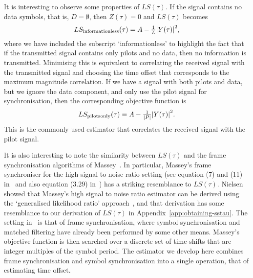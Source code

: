 \documentclass[journal]{IEEEtranTCOM}
\begin{document}
It is interesting to observe some properties of $LS(\tau)$.  If the signal contains no data symbols, that is, $D = \emptyset$, then $Z(\tau) = 0$ and $LS(\tau)$ becomes
\[
LS_{\text{informationless}}(\tau)  = A - \tfrac{1}{L} {\left\vert Y(\tau) \right\vert}^2,
\]
where we have included the subscript `informationless' to highlight the fact that if the transmitted signal contains only pilots and no data, then no information is transmitted.  Minimising this is equivalent to correlating the received signal with the transmitted signal and choosing the time offset that corresponds to the maximum magnitude correlation.  If we have a signal with both pilots and data, but we ignore the data component, and only use the pilot signal for synchronisation, then the corresponding objective function is
\[
LS_{\text{pilotsonly}}(\tau)  = A - \tfrac{1}{{\left\vert P \right\vert}} {\left\vert Y(\tau) \right\vert}^2.
\]
This is the commonly used estimator that correlates the received signal with the pilot signal.  %

It is also interesting to note the similarity between $LS(\tau)$ and the frame synchronisation algorithms of Massey~\cite{Massey1972optimumframe}.  In particular, Massey's frame synchroniser for the high signal to noise ratio setting (see equation (7) and (11) in~\cite{Massey1972optimumframe} and also equation (3.29) in~\cite{Robertson_frame_sync_phd_1995}) has a striking resemblance to $LS(\tau)$.  Nielsen~\cite{Nielsen_onmassey_1973} showed that Massey's high signal to noise ratio estimator can be derived using the `generalised likelihood ratio' approach~\cite[p.~86-96]{vanTrees_det_est_mod_part1_1968}, and that derivation has some resemblance to our derivation of $LS(\tau)$ in Appendix~\ref{app:obtaining-sstau}.  The setting in~\cite{Massey1972optimumframe} is that of frame synchronisation, where symbol synchronisation and matched filtering have already been performed by some other means.  Massey's objective function is then searched over a discrete set of time-shifts that are integer multiples of the symbol period.  The estimator we develop here combines frame synchronisation and symbol synchronisation into a single operation, that of estimating time offset.  %
\end{document}
